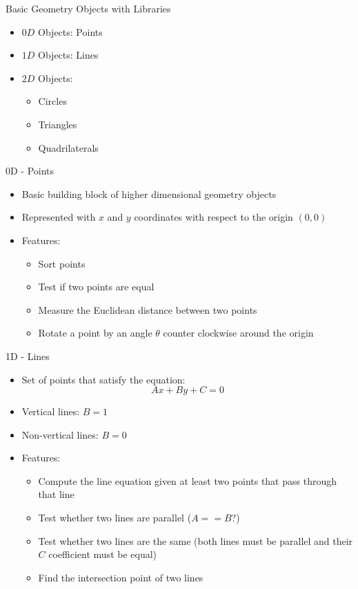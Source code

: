 \documentclass{beamer}
\begin{document}
\begin{frame}[fragile]{Basic Geometry Objects with Libraries}
    \begin{itemize}
        \item $0D$ Objects: Points
        \item $1D$ Objects: Lines
        \item $2D$ Objects:
            \begin{itemize}
                \item Circles
                \item Triangles
                \item Quadrilaterals
            \end{itemize}
    \end{itemize}
\end{frame}

\begin{frame}[fragile]{0D - Points}
    \begin{itemize}
        \item Basic building block of higher dimensional geometry objects
        \item Represented with $x$ and $y$ coordinates with respect to the origin $(0,0)$
        \item Features:
            \begin{itemize}
                \item Sort points
                \item Test if two points are equal
                \item Measure the Euclidean distance between two points
                \item Rotate a point by an angle $\theta$ counter clockwise around the origin
            \end{itemize}
    \end{itemize}
\end{frame}

\begin{frame}{1D - Lines}
    \begin{itemize}
        \item Set of points that satisfy the equation: $$Ax + By + C = 0$$
        \item Vertical lines: $B = 1$
        \item Non-vertical lines: $B = 0$
        \item Features: 
            \begin{itemize}
                \item Compute the line equation given at least two points that pass through that line
                \item Test whether two lines are parallel ($A == B$?)
                \item Test whether two lines are the same (both lines must be parallel and their $C$ coefficient must be equal)
                \item Find the intersection point of two lines
            \end{itemize}
    \end{itemize}
\end{frame}
\end{document}
